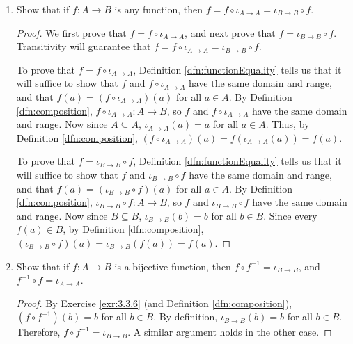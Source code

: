 \documentclass[../main.tex]{subfiles}
\begin{document}
\begin{enumerate}[ref={\thesection.\arabic*}]
\begin{enumerate}
\begin{proof}
            \begin{align*}
                \iota_{Y\to Z}\circ\iota_{X\to Y}(x) &= \iota_{Y\to Z}(\iota_{X\to Y}(x)) \tag*{Definition \ref{dfn:composition}}\\
                &= \iota_{Y\to Z}(x)\\
                &= x
            \end{align*}
            for all $x\in X$. Therefore, $\iota_{Y\to Z}\circ\iota_{X\to Y}=\iota_{X\to Z}$.
        \end{proof}
        \item Show that if $f:A\to B$ is any function, then $f=f\circ\iota_{A\to A}=\iota_{B\to B}\circ f$.
        \begin{proof}
            We first prove that $f=f\circ\iota_{A\to A}$, and next prove that $f=\iota_{B\to B}\circ f$. Transitivity will guarantee that $f=f\circ\iota_{A\to A}=\iota_{B\to B}\circ f$.\par
            To prove that $f=f\circ\iota_{A\to A}$, Definition \ref{dfn:functionEquality} tells us that it will suffice to show that $f$ and $f\circ\iota_{A\to A}$ have the same domain and range, and that $f(a)=(f\circ\iota_{A\to A})(a)$ for all $a\in A$. By Definition \ref{dfn:composition}, $f\circ\iota_{A\to A}:A\to B$, so $f$ and $f\circ\iota_{A\to A}$ have the same domain and range. Now since $A\subseteq A$, $\iota_{A\to A}(a)=a$ for all $a\in A$. Thus, by Definition \ref{dfn:composition}, $(f\circ\iota_{A\to A})(a)=f(\iota_{A\to A}(a))=f(a)$.\par
            To prove that $f=\iota_{B\to B}\circ f$, Definition \ref{dfn:functionEquality} tells us that it will suffice to show that $f$ and $\iota_{B\to B}\circ f$ have the same domain and range, and that $f(a)=(\iota_{B\to B}\circ f)(a)$ for all $a\in A$. By Definition \ref{dfn:composition}, $\iota_{B\to B}\circ f:A\to B$, so $f$ and $\iota_{B\to B}\circ f$ have the same domain and range. Now since $B\subseteq B$, $\iota_{B\to B}(b)=b$ for all $b\in B$. Since every $f(a)\in B$, by Definition \ref{dfn:composition}, $(\iota_{B\to B}\circ f)(a)=\iota_{B\to B}(f(a))=f(a)$.
        \end{proof}
        \item Show that if $f:A\to B$ is a bijective function, then $f\circ f^{-1}=\iota_{B\to B}$, and $f^{-1}\circ f=\iota_{A\to A}$.
        \begin{proof}
            By Exercise \ref{exr:3.3.6} (and Definition \ref{dfn:composition}), $(f\circ f^{-1})(b)=b$ for all $b\in B$. By definition, $\iota_{B\to B}(b)=b$ for all $b\in B$. Therefore, $f\circ f^{-1}=\iota_{B\to B}$. A similar argument holds in the other case.

\end{proof}
\end{enumerate}
\end{enumerate}
\end{document}
